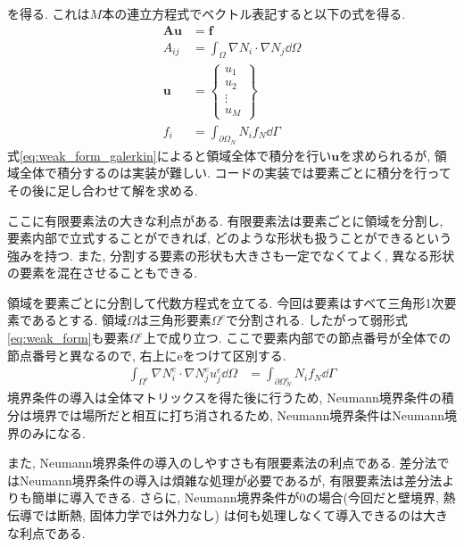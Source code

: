 \documentclass{ltjsarticle}
\begin{document}
を得る. これは$M$本の連立方程式でベクトル表記すると以下の式を得る.
\begin{align}
    \bm{A}\bm{u} &= \bm{f} \\
    A_{ij} &= \int_\Omega\nabla N_i\cdot\nabla N_j \dd{\Omega} \\
    \bm{u} &=
    \begin{Bmatrix}
        u_1\\u_2\\ \vdots \\ u_M
    \end{Bmatrix} \\
    f_{i} &= \int_{\partial\Omega_N}N_i f_N\dd{\Gamma} 
\end{align}
式\eqref{eq:weak_form_galerkin}によると領域全体で積分を行い$\bm{u}$を求められるが,
領域全体で積分するのは実装が難しい.
コードの実装では要素ごとに積分を行ってその後に足し合わせて解を求める.

ここに有限要素法の大きな利点がある.
有限要素法は要素ごとに領域を分割し,
要素内部で立式することができれば,
どのような形状も扱うことができるという強みを持つ.
また, 分割する要素の形状も大きさも一定でなくてよく, 
異なる形状の要素を混在させることもできる.

領域を要素ごとに分割して代数方程式を立てる. 今回は要素はすべて三角形1次要素であるとする.
領域$\Omega$は三角形要素$\Omega^e$で分割される.
したがって弱形式\eqref{eq:weak_form}も要素$\Omega^e$上で成り立つ. 
ここで要素内部での節点番号が全体での節点番号と異なるので, 右上にeをつけて区別する.
\begin{align}
    \int_{\Omega^e} \nabla N^e_i \cdot \nabla N^e_j u^e_j \dd{\Omega}
    &= \int_{\partial\Omega^e_N}N_i f_N\dd{\Gamma} \label{eq:weak_form_elemtnt}
\end{align}
境界条件の導入は全体マトリックスを得た後に行うため, 
Neumann境界条件の積分は境界では場所だと相互に打ち消されるため,
Neumann境界条件はNeumann境界のみになる.

また, Neumann境界条件の導入のしやすさも有限要素法の利点である.
差分法ではNeumann境界条件の導入は煩雑な処理が必要であるが,
有限要素法は差分法よりも簡単に導入できる.
さらに, Neumann境界条件が0の場合(今回だと壁境界, 熱伝導では断熱, 固体力学では外力なし)
は何も処理しなくて導入できるのは大きな利点である.
\end{document}
